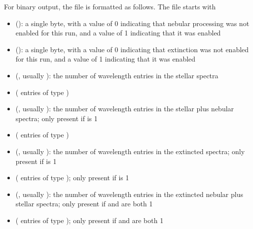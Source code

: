 \documentclass[letterpaper,10pt,english]{sphinxmanual}
\begin{document}
For binary output, the file is formatted as follows. The file starts with
\begin{itemize}
\item {} 
 (): a single byte, with a value of 0 indicating that nebular processing was not enabled for this run, and a value of 1 indicating that it was enabled

\item {} 
 (): a single byte, with a value of 0 indicating that extinction was not enabled for this run, and a value of 1 indicating that it was enabled

\item {} 
 (, usually ): the number of wavelength entries in the stellar spectra

\item {} 
 ( entries of type )

\item {} 
 (, usually ): the number of wavelength entries in the stellar plus nebular spectra; only present if  is 1

\item {} 
 ( entries of type )

\item {} 
 (, usually ): the number of wavelength entries in the extincted spectra; only present if  is 1

\item {} 
 ( entries of type ); only present if  is 1

\item {} 
 (, usually ): the number of wavelength entries in the extincted nebular plus stellar spectra; only present if  and  are both 1

\item {} 
 ( entries of type ); only present if  and  are both 1

\end{itemize}
\end{document}
